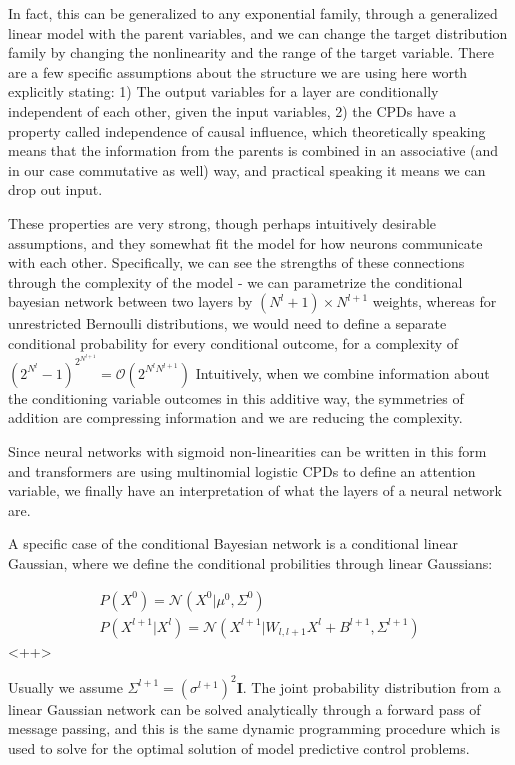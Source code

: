 \documentclass[a4paper]{article}
\begin{document}
In fact, this can be generalized to any exponential family, through a generalized linear model with the parent variables, and we can change the target distribution family by changing the nonlinearity and the range of the target variable. 
There are a few specific assumptions about the structure we are using here worth explicitly stating: 1) The output variables for a layer are conditionally independent of each other, given the input variables, 2) the CPDs have a property called independence of causal influence, which theoretically speaking means that the information from the parents is combined in an associative (and in our case commutative as well) way, and practical speaking it means we can drop out input. 

These properties are very strong, though perhaps intuitively desirable assumptions, and they somewhat fit the model for how neurons communicate with each other. 
Specifically, we can see the strengths of these connections through the complexity of the model - we can parametrize the conditional bayesian network between two layers by $(N^l+1) \times N^{l+1}$ weights, whereas for unrestricted Bernoulli distributions, we would need to define a separate conditional probability for every conditional outcome, for a complexity of $\left( 2^{N^{l}} -1 \right)^{2^{N^{l+1}}} = \mathcal{O} \left( 2^{N^l N^{l+1}} \right) $  
Intuitively, when we combine information about the conditioning variable outcomes in this additive way, the symmetries of addition are compressing information and we are reducing the complexity.

Since neural networks with sigmoid non-linearities can be written in this form and transformers are using multinomial logistic CPDs to define an attention variable, we finally have an interpretation of what the layers of a neural network are. 


A specific case of the conditional Bayesian network is a conditional linear Gaussian, where we define the conditional probilities through linear Gaussians:

\begin{equation}
  \begin{split}
    P(X^0) = \mathcal{N} \left( X^0 \vert \mu^0, \Sigma^0 \right) \\
    P(X^{l+1} \vert X^l) = \mathcal{N} \left( X^{l+1} \vert W_{l,l+1} X^l + B^{l+1}, \Sigma^{l+1} \right)
  \end{split}
  \label{<++>}
\end{equation}<++>

Usually we assume $\Sigma^{l+1} = \left( \sigma^{l+1} \right)^2 \mathbf{I}$. 
The joint probability distribution from a linear Gaussian network can be solved analytically through a forward pass of message passing, and this is the same dynamic programming procedure which is used to solve for the optimal solution of model predictive control problems.
\end{document}
